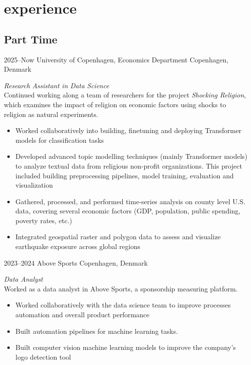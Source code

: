 \documentclass[]{friggeri-cv-a4}
\begin{document}

\section{experience}

\subsection{Part Time}

\begin{entrylist}


\entry
{2025--Now}
{University of Copenhagen, Economics Department}
{Copenhagen, Denmark}
{\emph{Research Assistant in Data Science} \\
Continued working along a team of researchers for the project \emph{Shocking Religion}, which examines the impact of religion on economic factors using shocks to religion as natural experiments. \\
\begin{itemize}
\item Worked collaboratively into building, finetuning and deploying Transformer models for classification tasks
\item Developed advanced topic modelling techniques (mainly Transformer models) to analyze textual data from religious non-profit organizations. This project included building preprocessing pipelines, model training, evaluation and visualization
\item Gathered, processed, and performed time-series analysis on county level U.S. data, covering several economic factors (GDP, population, public spending, poverty rates, etc.)
\item Integrated geospatial raster and polygon data to assess and visualize earthquake exposure across global regions
\end{itemize}}


\entry
{2023--2024}
{Above Sports}
{Copenhagen, Denmark}
{\emph{Data Analyst} \\
Worked as a data analyst in Above Sports, a sponsorship measuring platform.
\begin{itemize}
\item Worked collaboratively with the data science team to improve processes automation and overall product performance
\item Built automation pipelines for machine learning tasks.
\item Built computer vision machine learning models to improve the company's logo detection tool
\end{itemize}}


\end{entrylist}
\end{document}
